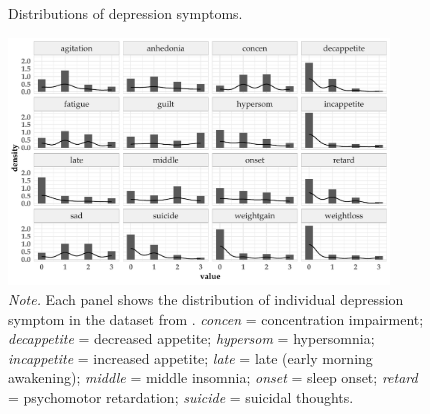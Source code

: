 \documentclass[twoside, 11pt]{article}
\begin{document}
\begin{appendices}
\vspace{3mm}
\begin{figure}[H]
    \centering
        \caption{Distributions of depression symptoms.}
        \includegraphics[width=0.9\textwidth]{figures/dep_dist.pdf}
        \caption*{\small{\textit{Note.} Each panel shows the distribution of individual depression symptom in the dataset from \cite{mcnally_co-morbid_2017}. \textit{concen} = concentration impairment; \textit{decappetite} = decreased appetite; \textit{hypersom} = hypersomnia; \textit{incappetite} = increased appetite; \textit{late} = late (early morning awakening); \textit{middle} = middle insomnia; \textit{onset} = sleep onset; \textit{retard} = psychomotor retardation; \textit{suicide} = suicidal thoughts.}}
    \label{fig:J1}
\end{figure}

\end{appendices}
\end{document}
